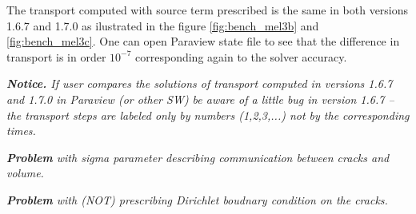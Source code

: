 The transport computed with source term prescribed is the same in both versions 1.6.7 and 1.7.0 as ilustrated in the figure
\ref{fig:bench_mel3b} and \ref{fig:bench_mel3c}. One can open Paraview state file to see that the difference in transport is in
order $10^{-7}$ corresponding again to the solver accuracy.




\emph{\textbf{Notice.} If user compares the solutions of transport computed in versions 1.6.7 and 1.7.0 in Paraview (or other SW)
be aware of a little bug in version 1.6.7 -- the transport steps are labeled only by numbers (1,2,3,...) not by the 
corresponding times. }

\emph{\textbf{Problem} with sigma parameter describing communication between cracks and volume.  }

\emph{\textbf{Problem} with (NOT) prescribing Dirichlet boudnary condition on the cracks.  }

